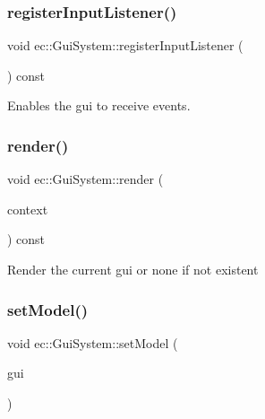 \mbox{\label{classec_1_1_gui_system_ab44adcdde652c58408b405b1c130615e}} 
\subsubsection{\texorpdfstring{register\+Input\+Listener()}{registerInputListener()}}
{\footnotesize\ttfamily void ec\+::\+Gui\+System\+::register\+Input\+Listener (\begin{DoxyParamCaption}{ }\end{DoxyParamCaption}) const}

Enables the gui to receive events. \mbox{\label{classec_1_1_gui_system_ac7a924d1ceb23683fab5889c5a9cb944}} 
\subsubsection{\texorpdfstring{render()}{render()}}
{\footnotesize\ttfamily void ec\+::\+Gui\+System\+::render (\begin{DoxyParamCaption}\item[{const \mbox{\hyperlink{structec_1_1_gui_render_context}{Gui\+Render\+Context}} \&}]{context }\end{DoxyParamCaption}) const}

Render the current gui or none if not existent \mbox{\label{classec_1_1_gui_system_a374997d1a8bbae3c72425bef4af574a0}} 
\subsubsection{\texorpdfstring{set\+Model()}{setModel()}}
{\footnotesize\ttfamily void ec\+::\+Gui\+System\+::set\+Model (\begin{DoxyParamCaption}\item[{\mbox{\hyperlink{classec_1_1_gui_system_a2ab0b1663243d1dbbf6624fd4c4d705e}{Gui\+\_\+\+Ptr}}}]{gui }\end{DoxyParamCaption})}

